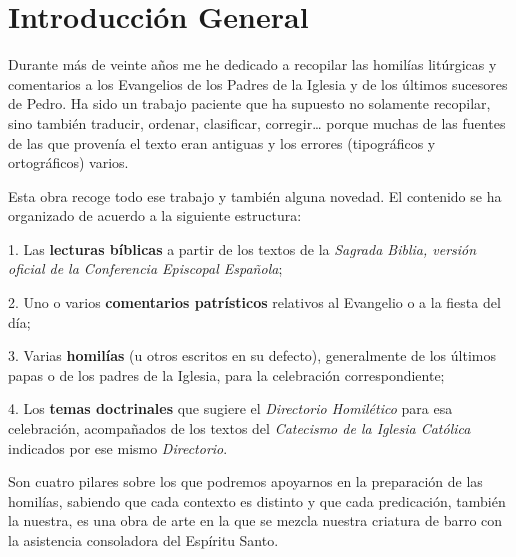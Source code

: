 \chapter{Introducción General}

\begin{bodyintro}Durante más de veinte años me he dedicado a recopilar las homilías litúrgicas y comentarios a los Evangelios de los Padres de la Iglesia y de los últimos sucesores de Pedro. Ha sido un trabajo paciente que ha supuesto no solamente recopilar, sino también traducir, ordenar, clasificar, corregir… porque muchas de las fuentes de las que provenía el texto eran antiguas y los errores (tipográficos y ortográficos) varios.\end{bodyintro}

\begin{bodyintro}Esta obra recoge todo ese trabajo y también alguna novedad. El contenido se ha organizado de acuerdo a la siguiente estructura:\end{bodyintro}

\begin{bodyintro}1. Las \textbf{lecturas bíblicas} a partir de los textos de la \textit{Sagrada Biblia, versión oficial de la Conferencia Episcopal Española};\end{bodyintro}

\begin{bodyintro}2. Uno o varios \textbf{comentarios patrísticos} relativos al Evangelio o a la fiesta del día;\end{bodyintro}

\begin{bodyintro}3. Varias \textbf{homilías }(u otros escritos en su defecto), generalmente de los últimos papas o de los padres de la Iglesia, para la celebración correspondiente;\end{bodyintro}

\begin{bodyintro}4. Los \textbf{temas doctrinales} que sugiere el \textit{Directorio Homilético} para esa celebración, acompañados de los textos del \textit{Catecismo de la Iglesia Católica} indicados por ese mismo \textit{Directorio}.\end{bodyintro}

\begin{bodyintro}Son cuatro pilares sobre los que podremos apoyarnos en la preparación de las homilías, sabiendo que cada contexto es distinto y que cada predicación, también la nuestra, es una obra de arte en la que se mezcla nuestra criatura de barro con la asistencia consoladora del Espíritu Santo.\end{bodyintro}
\newpage		
